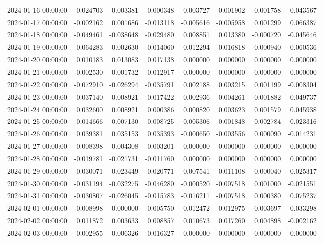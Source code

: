 \begin{tabular}{lrrrrrrr}
2024-01-16 00:00:00 & 0.024703 & 0.003381 & 0.000348 & -0.003727 & -0.001902 & 0.001758 & 0.043567 \\
2024-01-17 00:00:00 & -0.002162 & 0.001686 & -0.013118 & -0.005616 & -0.005958 & 0.001299 & 0.066387 \\
2024-01-18 00:00:00 & -0.049461 & -0.038648 & -0.029480 & 0.008851 & 0.013380 & -0.000720 & -0.045646 \\
2024-01-19 00:00:00 & 0.064283 & -0.002630 & -0.014060 & 0.012294 & 0.016818 & 0.000940 & -0.060536 \\
2024-01-20 00:00:00 & 0.010183 & 0.013083 & 0.017138 & 0.000000 & 0.000000 & 0.000000 & 0.000000 \\
2024-01-21 00:00:00 & 0.002530 & 0.001732 & -0.012917 & 0.000000 & 0.000000 & 0.000000 & 0.000000 \\
2024-01-22 00:00:00 & -0.072910 & -0.026294 & -0.035791 & 0.002188 & 0.003215 & 0.001199 & -0.008304 \\
2024-01-23 00:00:00 & -0.037140 & -0.008921 & -0.017422 & 0.002936 & 0.004261 & -0.001882 & -0.049737 \\
2024-01-24 00:00:00 & 0.032600 & 0.008921 & 0.000386 & 0.000820 & 0.003623 & 0.001579 & 0.045938 \\
2024-01-25 00:00:00 & -0.014666 & -0.007130 & -0.008725 & 0.005306 & 0.001848 & -0.002784 & 0.023316 \\
2024-01-26 00:00:00 & 0.039381 & 0.035153 & 0.035393 & -0.000650 & -0.003556 & 0.000090 & -0.014231 \\
2024-01-27 00:00:00 & 0.008398 & 0.004308 & -0.003201 & 0.000000 & 0.000000 & 0.000000 & 0.000000 \\
2024-01-28 00:00:00 & -0.019781 & -0.021731 & -0.011760 & 0.000000 & 0.000000 & 0.000000 & 0.000000 \\
2024-01-29 00:00:00 & 0.030071 & 0.023449 & 0.020771 & 0.007541 & 0.011108 & 0.000040 & 0.025317 \\
2024-01-30 00:00:00 & -0.031194 & -0.032275 & -0.046280 & -0.000520 & -0.007518 & 0.001000 & -0.021551 \\
2024-01-31 00:00:00 & -0.030807 & -0.026045 & -0.015783 & -0.016211 & -0.007518 & 0.000380 & 0.075237 \\
2024-02-01 00:00:00 & 0.008998 & 0.000000 & 0.005750 & 0.012472 & 0.012975 & -0.003697 & -0.033298 \\
2024-02-02 00:00:00 & 0.011872 & 0.003633 & 0.008857 & 0.010673 & 0.017260 & 0.004898 & -0.002162 \\
2024-02-03 00:00:00 & -0.002955 & 0.006326 & 0.016327 & 0.000000 & 0.000000 & 0.000000 & 0.000000 \\

\end{tabular}
